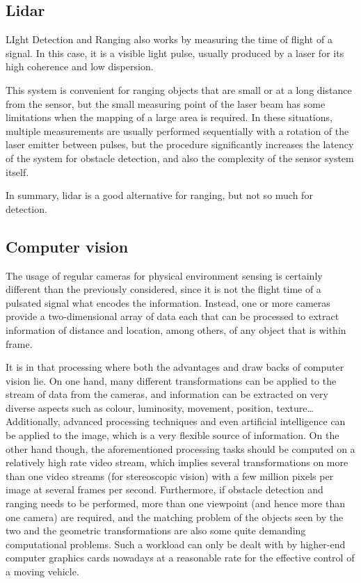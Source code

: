 \subsection{Lidar}

LIght Detection and Ranging also works by measuring the time of flight of a signal.
In this case, it is a visible light pulse, usually produced by a laser for its high coherence and low dispersion.

This system is convenient for ranging objects that are small or at a long distance from the sensor, but the small measuring point of the laser beam has some limitations when the mapping of a large area is required.
In these situations, multiple measurements are usually performed sequentially with a rotation of the laser emitter between pulses, but the procedure significantly increases the latency of the system for obstacle detection, and also the complexity of the sensor system itself.

In summary, lidar is a good alternative for ranging, but not so much for detection.

\subsection{Computer vision}

The usage of regular cameras for physical environment sensing is certainly different than the previously considered, since it is not the flight time of a pulsated signal what encodes the information.
Instead, one or more cameras provide a two-dimensional array of data each that can be processed to extract information of distance and location, among others, of any object that is within frame.

It is in that processing where both the advantages and draw backs of computer vision lie.
On one hand, many different transformations can be applied to the stream of data from the cameras, and information can be extracted on very diverse aspects such as colour, luminosity, movement, position, texture\dots \cite{ballard1982}
Additionally, advanced processing techniques and even artificial intelligence can be applied to the image, which is a very flexible source of information.
On the other hand though, the aforementioned processing tasks should be computed on a relatively high rate video stream, which implies several transformations on more than one video streams (for stereoscopic vision) with a few million pixels per image at several frames per second.
Furthermore, if obstacle detection and ranging needs to be performed, more than one viewpoint (and hence more than one camera) are required, and the matching problem of the objects seen by the two and the geometric transformations are also some quite demanding computational problems.
Such a workload can only be dealt with by higher-end computer graphics cards nowadays at a reasonable rate for the effective control of a moving vehicle.

